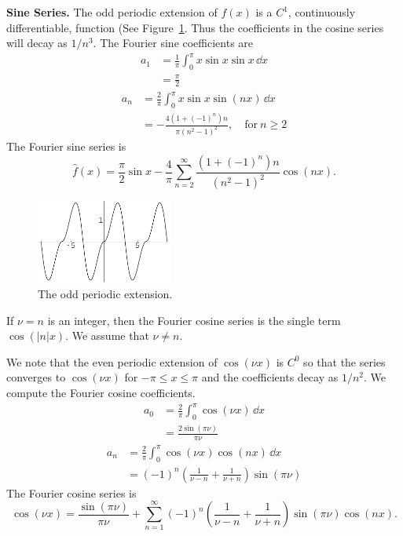 {\begin{Solution}
  \textbf{Sine Series.}
  The odd periodic extension of $f(x)$ is a $C^1$, continuously differentiable,
  function (See Figure~\ref{xsinx_sin_ser}.
  Thus the coefficients in the cosine series will decay as $1/n^3$.
  The Fourier sine coefficients are
  \begin{align*}
    a_1     &= \frac{1}{\pi} \int_0^\pi x \sin x \sin x \,\dd x \\
    &= \frac{\pi}{2}
  \end{align*}
  \begin{align*}
    a_n     &= \frac{2}{\pi} \int_0^\pi x \sin x \sin(n x) \,\dd x \\
    &= - \frac{4 (1 + (-1)^n) n}{\pi(n^2-1)^2}, \quad \mathrm{for}\ n \geq 2
  \end{align*}
  The Fourier sine series is
  \[
  \boxed{
    \hat{f}(x) = \frac{\pi}{2} \sin x 
    - \frac{4}{\pi} \sum_{n=2}^\infty \frac{(1 + (-1)^n)n}{(n^2-1)^2} 
    \cos(n x).
    }
  \]
  \begin{figure}[h!]
    \begin{center}
      \includegraphics[width=0.4\textwidth]{ode/fourier_series/xsinx_sin_ser}
    \end{center}
    \caption{The odd periodic extension.}
    \label{xsinx_sin_ser}
  \end{figure}
\end{Solution}






\begin{Solution}
  If $\nu = n$ is an integer, then the Fourier cosine series is the single term 
  $\cos(|n| x)$.  We assume that $\nu \neq n$.

  We note that the even periodic extension of 
  $\cos(\nu x)$ is $C^0$ so that the series converges to $\cos(\nu x)$ for
  $-\pi \leq x \leq \pi$ and the coefficients decay as $1/n^2$.
  We compute the Fourier cosine coefficients.
  \begin{align*}
    a_0 &= \frac{2}{\pi} \int_0^\pi \cos(\nu x) \,\dd x 
    \\
    &= \frac{2 \sin(\pi \nu)}{\pi \nu} 
  \end{align*}
  \begin{align*}
    a_n &= \frac{2}{\pi} \int_0^\pi \cos(\nu x) \cos(n x)\,\dd x 
    \\
    &= (-1)^n \left( \frac{1}{\nu - n} + \frac{1}{\nu + n} \right) 
    \sin(\pi \nu)
  \end{align*}
  The Fourier cosine series is
  \[
  \boxed{
    \cos(\nu x) = \frac{\sin(\pi \nu)}{\pi \nu} 
    + \sum_{n = 1}^\infty (-1)^n \left( \frac{1}{\nu - n} + \frac{1}{\nu + n} \right) 
    \sin(\pi \nu) \cos(n x).
    }
  \]


\end{Solution}}
